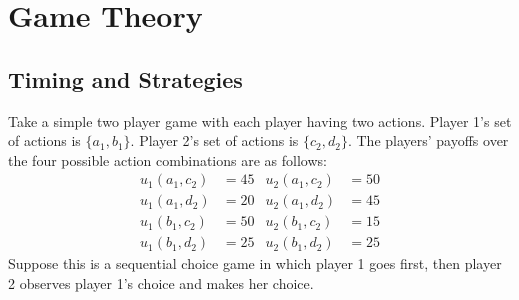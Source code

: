 \documentclass[11pt]{article}
\begin{document}
\section{Game Theory}
\subsection{Timing and Strategies}

\noindent Take a simple two player game with each player having two actions. Player 1's set of actions is $\{a_1,b_1\}$. Player 2's set of actions is $\{c_2,d_2\}$. The players' payoffs over the four possible action combinations are as follows:
\begin{align*}
u_1(a_1,c_2) &= 45 & u_2(a_1,c_2) &= 50\\
u_1(a_1,d_2) &= 20 & u_2(a_1,d_2) &= 45\\
u_1(b_1,c_2) &= 50 & u_2(b_1,c_2) &= 15\\
u_1(b_1,d_2) &= 25 & u_2(b_1,d_2) &= 25
\end{align*}
Suppose this is a sequential choice game in which player 1 goes first, then player 2 observes player 1's choice and makes her choice.
\end{document}
